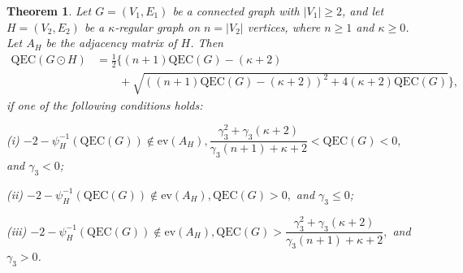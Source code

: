 \documentclass[pdflatex,sn-mathphys-num]{sn-jnl}
\theoremstyle{thmstyleone}%
\newtheorem{theorem}{Theorem}%
\theoremstyle{thmstyletwo}%
\theoremstyle{thmstylethree}%
\begin{document}
\begin{theorem}
\label{theo II : QEC of corona graph G and H}
Let $G=(V_1,E_1)$ be a connected graph with $|V_1|\ge 2$, and let 
$H=(V_2,E_2)$ be a $\kappa$-regular graph on $n=|V_2|$ vertices, where $n\geq 1$ and $\kappa\geq 0$. 
Let $A_H$ be the adjacency matrix of $H$. Then
\begin{align*}
\mathrm{QEC}(G \odot H) 
&=\frac{1}{2}\bigg\{(n+1)\mathrm{QEC}(G)-(\kappa+2)\\
& \qquad+\sqrt{\left((n+1)\mathrm{QEC}(G)-(\kappa+2)\right)^2
+4(\kappa+2)\mathrm{QEC}(G)}\bigg\},
\end{align*}
if one of the following conditions holds:

\medskip\noindent
\textit{(i)} $-2 - \psi_{H}^{-1}(\mathrm{QEC}(G)) \notin \mathrm{ev}(A_H), 
\dfrac{\gamma_3^2 + \gamma_3(\kappa+2)}{\gamma_3(n+1) + \kappa+2} < \mathrm{QEC}(G) < 0,$
and $\gamma_3 < 0$;

\medskip\noindent
\textit{(ii)} $-2 - \psi_{H}^{-1}(\mathrm{QEC}(G)) \notin \mathrm{ev}(A_H), 
\mathrm{QEC}(G) > 0,$ and $\gamma_3 \le 0$;

\medskip\noindent
\textit{(iii)} $-2 - \psi_{H}^{-1}(\mathrm{QEC}(G)) \notin \mathrm{ev}(A_H), 
\mathrm{QEC}(G) >
\dfrac{\gamma_3^2 + \gamma_3(\kappa+2)}{\gamma_3(n+1) + \kappa+2},$
and $\gamma_3 > 0$.
\end{theorem}
\end{document}
